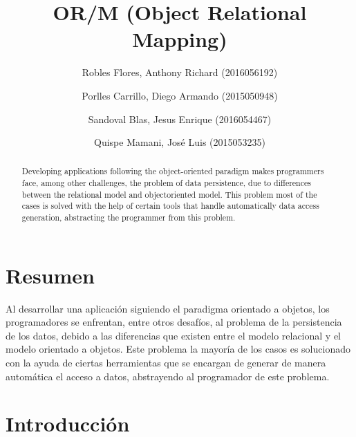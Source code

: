 \documentclass[preprint,12pt]{elsarticle}
\begin{document}
	
	\begin{frontmatter}

		\title{\huge OR/M (Object Relational Mapping)}
		
		\author{Robles Flores, Anthony Richard	              (2016056192)}
		\author{Porlles Carrillo, Diego Armando              (2015050948)}
		\author{Sandoval Blas, Jesus Enrique           (2016054467)}
		\author{Quispe Mamani, José Luis              (2015053235)}
		
		\address{Tacna, Perú}
		
		\begin{abstract}

Developing applications following the object-oriented paradigm makes programmers face, among other challenges, the problem of data persistence, due to differences between the relational model and objectoriented model. This problem most of the cases is solved with the help of certain tools that handle automatically data access generation, abstracting the programmer from this problem.
		\end{abstract}
\end{frontmatter}


\section{Resumen}

Al desarrollar una aplicación siguiendo el paradigma orientado a objetos, los programadores se
enfrentan, entre otros desafíos, al problema de la persistencia de los datos, debido a las diferencias que
existen entre el modelo relacional y el modelo orientado a objetos. Este problema la mayoría de los
casos es solucionado con la ayuda de ciertas herramientas que se encargan de generar de manera
automática el acceso a datos, abstrayendo al programador de este problema.



\section{Introducción}
\end{document}

